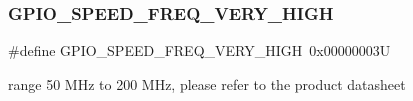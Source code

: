 \subsubsection{\texorpdfstring{G\+P\+I\+O\+\_\+\+S\+P\+E\+E\+D\+\_\+\+F\+R\+E\+Q\+\_\+\+V\+E\+R\+Y\+\_\+\+H\+I\+GH}{GPIO\_SPEED\_FREQ\_VERY\_HIGH}}
{\footnotesize\ttfamily \#define G\+P\+I\+O\+\_\+\+S\+P\+E\+E\+D\+\_\+\+F\+R\+E\+Q\+\_\+\+V\+E\+R\+Y\+\_\+\+H\+I\+GH~0x00000003U}

range 50 M\+Hz to 200 M\+Hz, please refer to the product datasheet 
